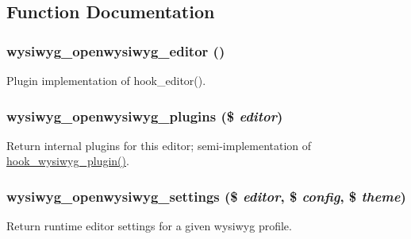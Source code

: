 \subsection{Function Documentation}
\hypertarget{openwysiwyg_8inc_a7c46ef5a74e5ae97ec4a95682acaef9c}{
\subsubsection[{wysiwyg\_\-openwysiwyg\_\-editor}]{\setlength{\rightskip}{0pt plus 5cm}wysiwyg\_\-openwysiwyg\_\-editor ()}}
\label{openwysiwyg_8inc_a7c46ef5a74e5ae97ec4a95682acaef9c}
Plugin implementation of hook\_\-editor(). \hypertarget{openwysiwyg_8inc_a7107bf053029e89ae2c347c94fbc8b5d}{
\subsubsection[{wysiwyg\_\-openwysiwyg\_\-plugins}]{\setlength{\rightskip}{0pt plus 5cm}wysiwyg\_\-openwysiwyg\_\-plugins (\$ {\em editor})}}
\label{openwysiwyg_8inc_a7107bf053029e89ae2c347c94fbc8b5d}
Return internal plugins for this editor; semi-\/implementation of \hyperlink{wysiwyg_8api_8php_abad2b35b32be0b20d73006b73205045c}{hook\_\-wysiwyg\_\-plugin()}. \hypertarget{openwysiwyg_8inc_a2a604d0692cdfd7a3e01946f60eb8e73}{
\subsubsection[{wysiwyg\_\-openwysiwyg\_\-settings}]{\setlength{\rightskip}{0pt plus 5cm}wysiwyg\_\-openwysiwyg\_\-settings (\$ {\em editor}, \/  \$ {\em config}, \/  \$ {\em theme})}}
\label{openwysiwyg_8inc_a2a604d0692cdfd7a3e01946f60eb8e73}
Return runtime editor settings for a given wysiwyg profile.


